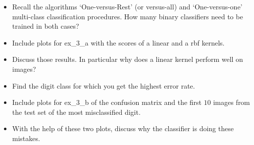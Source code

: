 \documentclass[a4paper]{article}
\begin{document}
\begin{itemize}
\item Recall the algorithms ‘One-versus-Rest’ (or versus-all) and ‘One-versus-one’ multi-class classification
procedures. How many binary classifiers need to be trained in both cases?
\item Include plots for ex\_3\_a with the scores of a linear and a rbf kernels.
\item Discuss those results. In particular why does a linear kernel perform well on images?
\item Find the digit class for which you get the highest error rate.
\item Include plots for ex\_3\_b of the confusion matrix and the first $10$ images from the test set of the most misclassified digit.
\item With the help of these two plots, discuss why the classifier is doing these mistakes.
\end{itemize}
\end{document}
